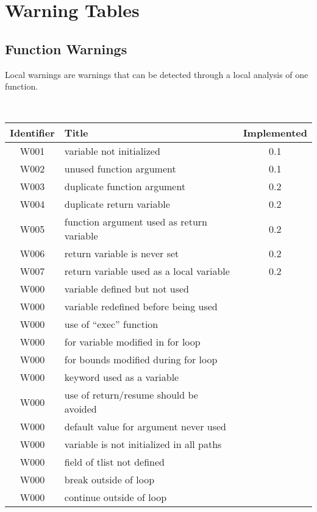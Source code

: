 \section{Warning Tables}

\subsection{Function Warnings}



Local warnings are warnings that can be detected through a local analysis of
one function.



\noindent\\\begin{tabular}{|c|p{8cm}|c|} \hline
Identifier & Title & Implemented      \\ \hline
W001 & variable not initialized & 0.1 \\ \hline
W002 & unused function argument & 0.1 \\ \hline
W003 & duplicate function argument & 0.2 \\ \hline
W004 & duplicate return variable   & 0.2 \\ \hline
W005 & function argument used as return variable   & 0.2 \\ \hline
W006 & return variable is never set & 0.2 \\ \hline
W007 & return variable used as a local variable & 0.2 \\ \hline
W000 & variable defined but not used &  \\ \hline
W000 & variable redefined before being used &  \\ \hline
W000 & use of ``exec'' function      &  \\ \hline
W000 & for variable modified in for loop &  \\ \hline
W000 & for bounds modified during for loop &  \\ \hline
W000 & keyword used as a variable &  \\ \hline
W000 & use of return/resume should be avoided &  \\ \hline
W000 & default value for argument never used &  \\ \hline
W000 & variable is not initialized in all paths &  \\ \hline
W000 & field of tlist not defined &  \\ \hline
W000 & break outside of loop &  \\ \hline
W000 & continue outside of loop &  \\ \hline
\end{tabular}

